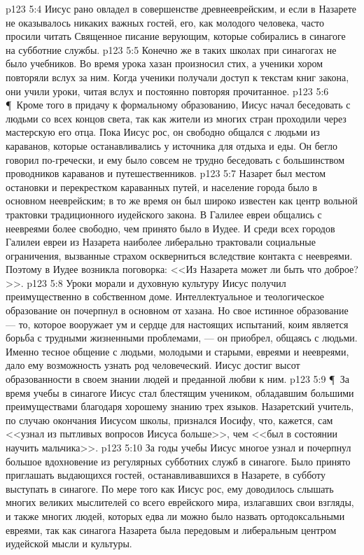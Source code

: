 \vs p123 5:4 Иисус рано овладел в совершенстве древнееврейским, и если в Назарете не оказывалось никаких важных гостей, его, как молодого человека, часто просили читать Священное писание верующим, которые собирались в синагоге на субботние службы.
\vs p123 5:5 Конечно же в таких школах при синагогах не было учебников. Во время урока хазан произносил стих, а ученики хором повторяли вслух за ним. Когда ученики получали доступ к текстам книг закона, они учили уроки, читая вслух и постоянно повторяя прочитанное.
\vs p123 5:6 \P\ Кроме того в придачу к формальному образованию, Иисус начал беседовать с людьми со всех концов света, так как жители из многих стран проходили через мастерскую его отца. Пока Иисус рос, он свободно общался с людьми из караванов, которые останавливались у источника для отдыха и еды. Он бегло говорил по\hyp{}гречески, и ему было совсем не трудно беседовать с большинством проводников караванов и путешественников.
\vs p123 5:7 Назарет был местом остановки и перекрестком караванных путей, и население города было в основном нееврейским; в то же время он был широко известен как центр вольной трактовки традиционного иудейского закона. В Галилее евреи общались с неевреями более свободно, чем принято было в Иудее. И среди всех городов Галилеи евреи из Назарета наиболее либерально трактовали социальные ограничения, вызванные страхом оскверниться вследствие контакта с неевреями. Поэтому в Иудее возникла поговорка: <<Из Назарета может ли быть что доброе?>>.
\vs p123 5:8 Уроки морали и духовную культуру Иисус получил преимущественно в собственном доме. Интеллектуальное и теологическое образование он почерпнул в основном от хазана. Но свое истинное образование --- то, которое вооружает ум и сердце для настоящих испытаний, коим является борьба с трудными жизненными проблемами, --- он приобрел, общаясь с людьми. Именно тесное общение с людьми, молодыми и старыми, евреями и неевреями, дало ему возможность узнать род человеческий. Иисус достиг высот образованности в своем знании людей и преданной любви к ним.
\vs p123 5:9 \P\ За время учебы в синагоге Иисус стал блестящим учеником, обладавшим большими преимуществами благодаря хорошему знанию трех языков. Назаретский учитель, по случаю окончания Иисусом школы, признался Иосифу, что, кажется, сам <<узнал из пытливых вопросов Иисуса больше>>, чем <<был в состоянии научить мальчика>>.
\vs p123 5:10 За годы учебы Иисус многое узнал и почерпнул большое вдохновение из регулярных субботних служб в синагоге. Было принято приглашать выдающихся гостей, останавливавшихся в Назарете, в субботу выступать в синагоге. По мере того как Иисус рос, ему доводилось слышать многих великих мыслителей со всего еврейского мира, излагавших свои взгляды, и также многих людей, которых едва ли можно было назвать ортодоксальными евреями, так как синагога Назарета была передовым и либеральным центром иудейской мысли и культуры.
